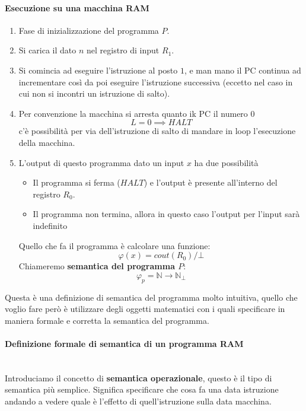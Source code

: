 \documentclass{article}
\begin{document}
\paragraph{Esecuzione su una macchina RAM}
\begin{enumerate}
    \item Fase di inizializzazione del programma $P$.
    \item Si carica il dato $n$ nel registro di input $R_1$.
    \item Si comincia ad eseguire l'istruzione al posto $1$, e man mano
          il PC continua ad incrementare così da poi eseguire l'istruzione successiva
          (eccetto nel caso in cui non si incontri un istruzione di salto).
    \item Per convenzione la macchina si arresta quanto ik PC il numero $0$
          $$L=0\implies HALT$$
          c'è possibilità per via dell'istruzione di salto di mandare in loop
          l'esecuzione della macchina.
    \item L'output di questo programma dato un input $x$ ha due possibilità
          \begin{itemize}
              \item Il programma si ferma ($HALT$) e l'output è presente all'interno del registro $R_0$.
              \item Il programma non termina, allora in questo caso l'output
                    per l'input sarà indefinito
          \end{itemize}
          Quello che fa il programma è calcolare una funzione:
          $$\varphi(x)=cout(R_0)/\bot$$
          Chiameremo \textbf{semantica del programma $P$}:
          $$\varphi_p = \mathbb{N}\rightarrow\mathbb{N}_\bot$$
\end{enumerate}
Questa è una definizione di semantica del programma molto intuitiva, quello che voglio
fare però è utilizzare degli oggetti matematici con i quali specificare
in maniera formale e corretta la semantica del programma.

\paragraph{Definizione formale di semantica di un programma RAM}\mbox{}\\
Introduciamo il concetto di \textbf{semantica operazionale}, questo è il tipo di semantica
più semplice. Significa specificare che cosa fa una data istruzione andando a vedere quale
è l'effetto di quell'istruzione sulla data macchina.
\end{document}
